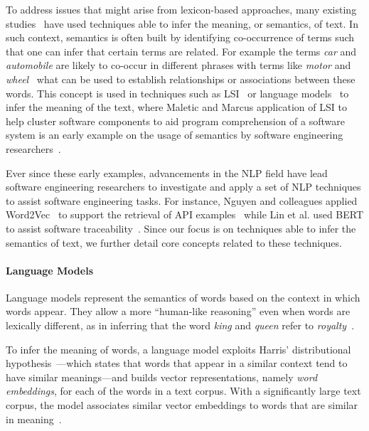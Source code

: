 To address issues that might arise from lexicon-based approaches,
many existing studies~\cite{silva2019, Huang2018, Ye2016, huang2018automating} have used techniques able to infer the meaning, or semantics, of text. 
In such context, semantics is often built by identifying co-occurrence of terms such that one can infer that certain terms are related. For example 
the terms \textit{car} and \textit{automobile} are likely to co-occur in different phrases with terms like \textit{motor} and \textit{wheel}~\cite{Bavota2016}
what can be used to establish relationships or associations between these words.
This concept is used in techniques such as \acf{LSI}~\cite{deerwester1990LSI} or language models~\cite{Mikolov2013} to infer the meaning of the text,
where Maletic and Marcus application of \acs{LSI} to help cluster software components to aid
program comprehension of a software system
is an early example on the usage of semantics by software engineering researchers~\cite{Marcus2003}.


Ever since these early examples, advancements in the \acf{NLP} field have lead software engineering researchers 
to investigate and apply a set of \acs{NLP} techniques to assist software engineering tasks. For instance,
Nguyen and colleagues
applied Word2Vec~\cite{Mikolov2013} to support the retrieval of API
examples~\cite{nguyen2017} while Lin et al. used BERT to assist software traceability~\cite{Lin2021}. 
Since our focus is on techniques able to infer the semantics of text, we further detail core concepts related to these techniques. 



\paragraph{\textbf{Language Models}}

Language models represent the semantics of words based on the context in which words appear. They allow a more ``human-like reasoning'' even when words are lexically different, as in inferring that the word \textit{king} and
\textit{queen} refer to \textit{royalty}~\cite{Mikolov2013}.


To infer the meaning of words, a language model exploits Harris' distributional hypothesis~\cite{harris1954distributional}---which states that words that appear in a similar context tend to have similar meanings---and builds vector representations, namely \textit{word embeddings}, for each of the words in a text corpus.
With a significantly large text corpus, the model associates similar vector embeddings to words that are similar in meaning~\cite{Ye2016}. 





